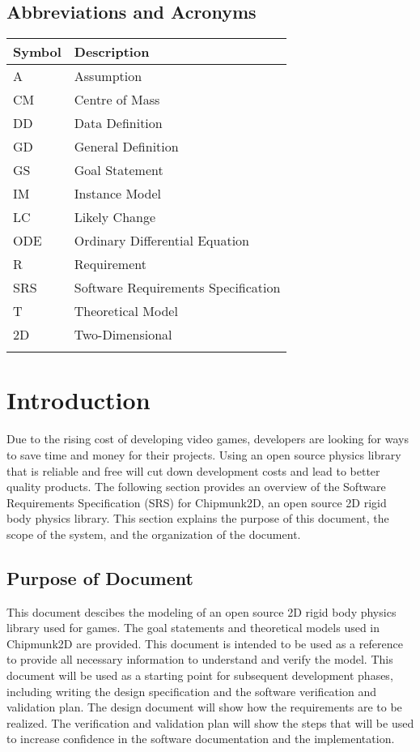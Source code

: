 \documentclass[12pt]{article}
\begin{document}
\subsection{Abbreviations and Acronyms}
\label{Sec:AaA}
\begin{longtable*}{l l}
\toprule
Symbol & Description
\\
\midrule
A & Assumption
\\
CM & Centre of Mass
\\
DD & Data Definition
\\
GD & General Definition
\\
GS & Goal Statement
\\
IM & Instance Model
\\
LC & Likely Change
\\
ODE & Ordinary Differential Equation
\\
R & Requirement
\\
SRS & Software Requirements Specification
\\
T & Theoretical Model
\\
2D & Two-Dimensional
\\
\bottomrule
\label{Table:AaA}
\end{longtable*}
\section{Introduction}
\label{Sec:I}
Due to the rising cost of developing video games, developers are looking for ways to save time and money for their projects. Using an open source physics library that is reliable and free will cut down development costs and lead to better quality products.
The following section provides an overview of the Software Requirements Specification (SRS) for Chipmunk2D, an open source 2D rigid body physics library. This section explains the purpose of this document, the scope of the system, and the organization of the document.
\subsection{Purpose of Document}
\label{Sec:PoD}
This document descibes the modeling of an open source 2D rigid body physics library used for games. The goal statements and theoretical models used in Chipmunk2D are provided. This document is intended to be used as a reference to provide all necessary information to understand and verify the model.
This document will be used as a starting point for subsequent development phases, including writing the design specification and the software verification and validation plan. The design document will show how the requirements are to be realized. The verification and validation plan will show the steps that will be used to increase confidence in the software documentation and the implementation.
\end{document}
